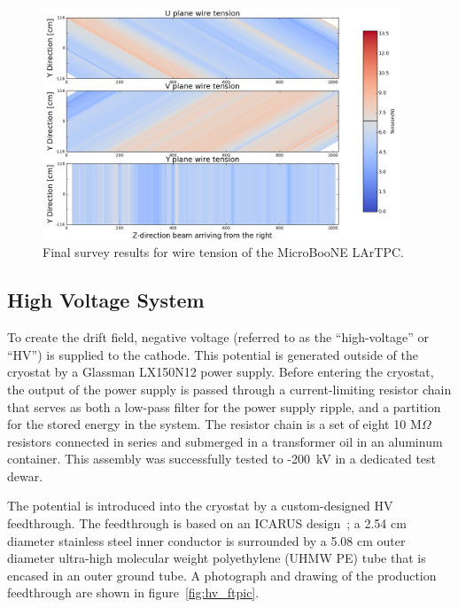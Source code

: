 \begin{figure}
\centering
\includegraphics[width=0.95\textwidth]{figures/WireTension_201605_updatedcolors.png}
\caption{Final survey results for wire tension of the MicroBooNE LArTPC.}
\label{fig:heatmap}
\end{figure} 





%
\subsection{High Voltage System}
\label{sec:hv}

To create the drift field, negative voltage (referred to as the ``high-voltage'' or ``HV'') is supplied to the \lartpc cathode.  This potential is generated outside of the cryostat by a Glassman LX150N12 power supply.  Before entering the cryostat, the output of the power supply is passed through a current-limiting resistor chain that serves as both a low-pass filter for the power supply ripple, and a partition for the stored energy in the system.  The resistor chain is a set of eight 10 M$\Omega$ resistors connected in series and submerged in a transformer oil in an aluminum container.  This assembly was successfully tested to -200~kV in a dedicated test dewar.

The potential is introduced into the cryostat by a custom-designed HV feedthrough.  The feedthrough is based on an ICARUS design~\cite{Amerio:2004-T600}; a 2.54 cm diameter stainless steel inner conductor is surrounded by a 5.08 cm outer diameter ultra-high molecular weight polyethylene (UHMW PE) tube that is encased in an outer ground tube.  A photograph and drawing of the production feedthrough are shown in figure~\ref{fig:hv_ftpic}.

